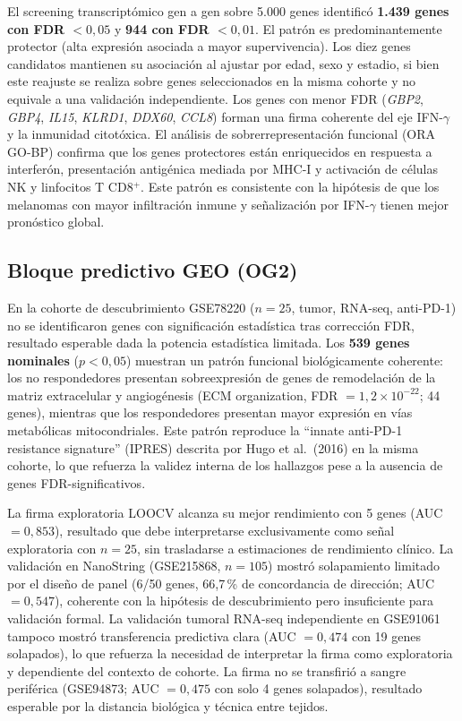 El screening transcriptómico gen a gen sobre 5.000 genes identificó \textbf{1.439 genes con FDR $< 0{,}05$} y \textbf{944 con FDR $< 0{,}01$}. El patrón es predominantemente protector (alta expresión asociada a mayor supervivencia). Los diez genes candidatos mantienen su asociación al ajustar por edad, sexo y estadio, si bien este reajuste se realiza sobre genes seleccionados en la misma cohorte y no equivale a una validación independiente. Los genes con menor FDR (\textit{GBP2}, \textit{GBP4}, \textit{IL15}, \textit{KLRD1}, \textit{DDX60}, \textit{CCL8}) forman una firma coherente del eje IFN-$\gamma$ y la inmunidad citotóxica. El análisis de sobrerrepresentación funcional (ORA GO-BP) confirma que los genes protectores están enriquecidos en respuesta a interferón, presentación antigénica mediada por MHC-I y activación de células NK y linfocitos T CD8$^+$. Este patrón es consistente con la hipótesis de que los melanomas con mayor infiltración inmune y señalización por IFN-$\gamma$ tienen mejor pronóstico global.

\subsection{Bloque predictivo GEO (OG2)}

En la cohorte de descubrimiento GSE78220 ($n = 25$, tumor, RNA-seq, anti-PD-1) no se identificaron genes con significación estadística tras corrección FDR, resultado esperable dada la potencia estadística limitada. Los \textbf{539 genes nominales} ($p < 0{,}05$) muestran un patrón funcional biológicamente coherente: los no respondedores presentan sobreexpresión de genes de remodelación de la matriz extracelular y angiogénesis (ECM organization, FDR $= 1{,}2\times10^{-22}$; 44 genes), mientras que los respondedores presentan mayor expresión en vías metabólicas mitocondriales. Este patrón reproduce la ``innate anti-PD-1 resistance signature'' (IPRES) descrita por Hugo et al.\ (2016) \cite{Hugo2016} en la misma cohorte, lo que refuerza la validez interna de los hallazgos pese a la ausencia de genes FDR-significativos.

La firma exploratoria LOOCV alcanza su mejor rendimiento con 5 genes (AUC $= 0{,}853$), resultado que debe interpretarse exclusivamente como señal exploratoria con $n = 25$, sin trasladarse a estimaciones de rendimiento clínico. La validación en NanoString (GSE215868, $n = 105$) mostró solapamiento limitado por el diseño de panel (6/50 genes, 66{,}7\,\% de concordancia de dirección; AUC $= 0{,}547$), coherente con la hipótesis de descubrimiento pero insuficiente para validación formal. La validación tumoral RNA-seq independiente en GSE91061 tampoco mostró transferencia predictiva clara (AUC $= 0{,}474$ con 19 genes solapados), lo que refuerza la necesidad de interpretar la firma como exploratoria y dependiente del contexto de cohorte. La firma no se transfirió a sangre periférica (GSE94873; AUC $= 0{,}475$ con solo 4 genes solapados), resultado esperable por la distancia biológica y técnica entre tejidos.


